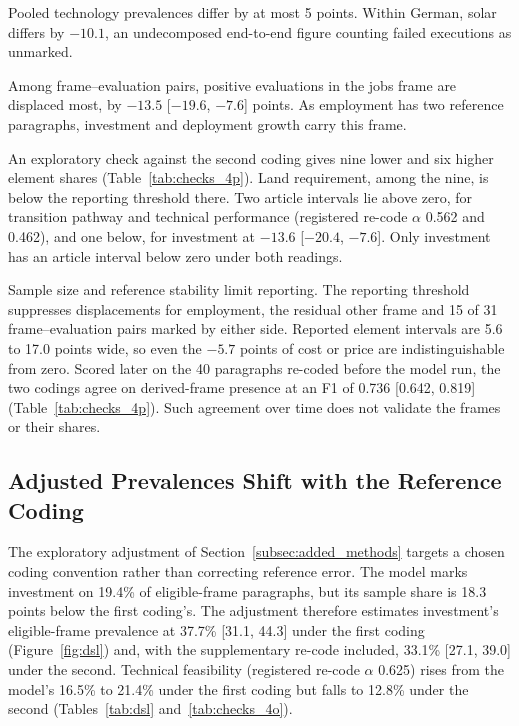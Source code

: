 Pooled technology prevalences differ by at most 5 points. Within German, solar differs by $-10.1$, an undecomposed end-to-end figure counting failed executions as unmarked.

Among frame--evaluation pairs, positive evaluations in the jobs frame are displaced most, by $-13.5$ [$-19.6$, $-7.6$] points. As employment has two reference paragraphs, investment and deployment growth carry this frame.

An exploratory check against the second coding gives nine lower and six higher element shares (Table~\ref{tab:checks_4p}). Land requirement, among the nine, is below the reporting threshold there. Two article intervals lie above zero, for transition pathway and technical performance (registered re-code $\alpha$ 0.562 and 0.462), and one below, for investment at $-13.6$ [$-20.4$, $-7.6$]. Only investment has an article interval below zero under both readings.

Sample size and reference stability limit reporting. The reporting threshold suppresses displacements for employment, the residual other frame and 15 of 31 frame--evaluation pairs marked by either side. Reported element intervals are 5.6 to 17.0 points wide, so even the $-5.7$ points of cost or price are indistinguishable from zero. Scored later on the 40 paragraphs re-coded before the model run, the two codings agree on derived-frame presence at an F1 of 0.736 [0.642, 0.819] (Table~\ref{tab:checks_4p}). Such agreement over time does not validate the frames or their shares.

\subsection{Adjusted Prevalences Shift with the Reference Coding}\label{subsec:dsl_results}\label{subsec:after_registered}\label{subsec:instrument_checks}

The exploratory adjustment of Section~\ref{subsec:added_methods} targets a chosen coding convention rather than correcting reference error. The model marks investment on 19.4\% of eligible-frame paragraphs, but its sample share is 18.3 points below the first coding's. The adjustment therefore estimates investment's eligible-frame prevalence at 37.7\% [31.1, 44.3] under the first coding (Figure~\ref{fig:dsl}) and, with the supplementary re-code included, 33.1\% [27.1, 39.0] under the second. Technical feasibility (registered re-code $\alpha$ 0.625) rises from the model's 16.5\% to 21.4\% under the first coding but falls to 12.8\% under the second (Tables~\ref{tab:dsl} and~\ref{tab:checks_4o}).

